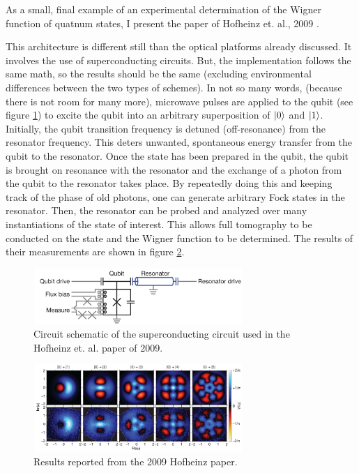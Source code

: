 As a small, final example of an experimental determination of the Wigner function of quatnum states, I present the paper of Hofheinz et. al., 2009 \cite{Hofheinz}.

This architecture is different still than the optical platforms already discussed. It involves the use of superconducting circuits. But, the implementation follows the same math, so the results should be the same (excluding environmental differences between the two types of schemes). In not so many words, (because there is not room for many more), microwave pulses are applied to the qubit (see figure \ref{HofheinzSetUp}) to excite the qubit into an arbitrary superposition of $\ket{0}$ and $\ket{1}$. Initially, the qubit transition frequency is detuned (off-resonance) from the resonator frequency. This deters unwanted, spontaneous energy transfer from the qubit to the resonator. Once the state has been prepared in the qubit, the qubit is brought on resonance with the resonator and the exchange of a photon from the qubit to the resonator takes place. By repeatedly doing this and keeping track of the phase of old photons, one can generate arbitrary Fock states in the resonator. Then, the resonator can be probed and analyzed over many instantiations of the state of interest. This allows full tomography to be conducted on the state and the Wigner function to be determined. The results of their measurements are shown in figure \ref{HofheinzResults}.	

\begin{figure}%
\begin{center}
\includegraphics[width=300px,height=80px]{Figures/HofheinzSetUp.png}%
\caption{Circuit schematic of the superconducting circuit used in the Hofheinz et. al. paper of 2009.}%
\label{HofheinzSetUp}%
\end{center}
\end{figure}


\begin{figure}%
\begin{center}	
\includegraphics[width=300px,height=125px]{Figures/HofheinzResults.png}%
\caption{Results reported from the 2009 Hofheinz paper.}%
\label{HofheinzResults}%
\end{center}
\end{figure}
